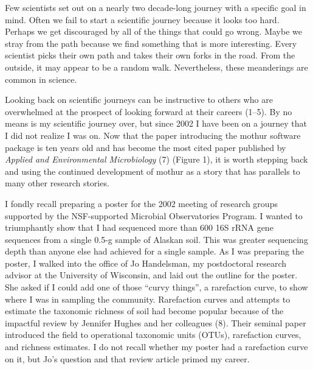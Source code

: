 \documentclass[11pt,]{article}
\begin{document}
\newpage

Few scientists set out on a nearly two decade-long journey with a
specific goal in mind. Often we fail to start a scientific journey
because it looks too hard. Perhaps we get discouraged by all of the
things that could go wrong. Maybe we stray from the path because we find
something that is more interesting. Every scientist picks their own path
and takes their own forks in the road. From the outside, it may appear
to be a random walk. Nevertheless, these meanderings are common in
science.

Looking back on scientific journeys can be instructive to others who are
overwhelmed at the prospect of looking forward at their careers (1--5).
By no means is my scientific journey over, but since 2002 I have been on
a journey that I did not realize I was on. Now that the paper
introducing the mothur software package is ten years old and has become
the most cited paper published by \emph{Applied and Environmental
Microbiology} (7) (Figure 1), it is worth stepping back and using the
continued development of mothur as a story that has parallels to many
other research stories.

I fondly recall preparing a poster for the 2002 meeting of research
groups supported by the NSF-supported Microbial Observatories Program. I
wanted to triumphantly show that I had sequenced more than 600 16S rRNA
gene sequences from a single 0.5-g sample of Alaskan soil. This was
greater sequencing depth than anyone else had achieved for a single
sample. As I was preparing the poster, I walked into the office of Jo
Handelsman, my postdoctoral research advisor at the University of
Wisconsin, and laid out the outline for the poster. She asked if I could
add one of those ``curvy things'', a rarefaction curve, to show where I
was in sampling the community. Rarefaction curves and attempts to
estimate the taxonomic richness of soil had become popular because of
the impactful review by Jennifer Hughes and her colleagues (8). Their
seminal paper introduced the field to operational taxonomic units
(OTUs), rarefaction curves, and richness estimates. I do not recall
whether my poster had a rarefaction curve on it, but Jo's question and
that review article primed my career.
\end{document}
